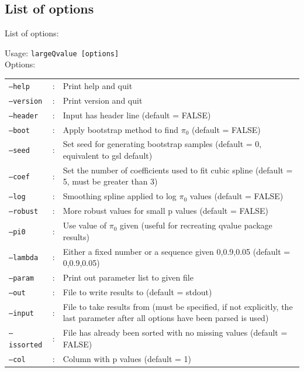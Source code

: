 \documentclass{amsart}
\begin{document}
\begin{framed}
  \subsection{List of options}

  \noindent List of options:

  \noindent Usage: \texttt{largeQvalue [options]}\\
  \noindent Options:


 \begin{tabular}{llp{9cm}}
    \texttt{--help}    & : &Print help and quit \\
    \texttt{--version} & : &Print version and quit \\
    \texttt{--header}  & : &Input has header line (default = FALSE) \\
    \texttt{--boot}    & : &Apply bootstrap method to find $\pi_0$ (default = FALSE) \\
    \texttt{--seed}    & : &Set seed for generating bootstrap samples (default = 0, equivalent to gsl default) \\
    \texttt{--coef}    & : &Set the number of coefficients used to fit cubic spline (default = 5, must be greater than 3) \\
    \texttt{--log}     & : &Smoothing spline applied to log $\pi_0$ values (default = FALSE) \\
    \texttt{--robust}  & : &More robust values for small p values (default = FALSE) \\
    \texttt{--pi0}     & : &Use value of $\pi_0$ given (useful for recreating qvalue package results) \\
    \texttt{--lambda}  & : &Either a fixed number or a sequence given 0,0.9,0.05 (default = 0,0.9,0.05) \\
    \texttt{--param}   & : &Print out parameter list to given file \\
    \texttt{--out}     & : &File to write results to (default = stdout) \\
    \texttt{--input}   & : &File to take results from (must be specified, if not explicitly, the last parameter after all options have been parsed is used) \\
    \texttt{--issorted}& : &File has already been sorted with no missing values (default = FALSE) \\
    \texttt{--col}     & : &Column with p values (default = 1) \\
\end{tabular}
 \end{framed}
\end{document}
